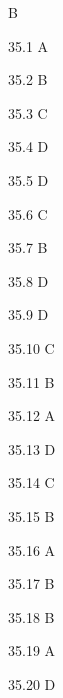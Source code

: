 \begin{Solution}{35}
B
\end{Solution}
\begin{Solution}{35.{1}}
A
\end{Solution}
\begin{Solution}{35.{2}}
B
\end{Solution}
\begin{Solution}{35.{3}}
C
\end{Solution}
\begin{Solution}{35.{4}}
D
\end{Solution}
\begin{Solution}{35.{5}}
D
\end{Solution}
\begin{Solution}{35.{6}}
C
\end{Solution}
\begin{Solution}{35.{7}}
B
\end{Solution}
\begin{Solution}{35.{8}}
D
\end{Solution}
\begin{Solution}{35.{9}}
D
\end{Solution}
\begin{Solution}{35.{10}}
C
\end{Solution}
\begin{Solution}{35.{11}}
B
\end{Solution}
\begin{Solution}{35.{12}}
A
\end{Solution}
\begin{Solution}{35.{13}}
D
\end{Solution}
\begin{Solution}{35.{14}}
C
\end{Solution}
\begin{Solution}{35.{15}}
B
\end{Solution}
\begin{Solution}{35.{16}}
A
\end{Solution}
\begin{Solution}{35.{17}}
B
\end{Solution}
\begin{Solution}{35.{18}}
B
\end{Solution}
\begin{Solution}{35.{19}}
A
\end{Solution}
\begin{Solution}{35.{20}}
D
\end{Solution}
